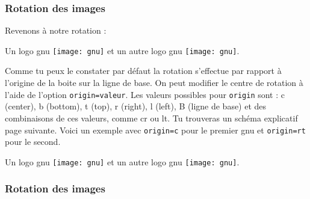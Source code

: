 \documentclass[10pt,hyperref={pdfpagemode=FullScreen},xcolor=dvipsnames,xcolor=table, xcolor=svgnames]{beamer}%
\begin{document}
 \begin{frame}[fragile]
   \frametitle{Rotation des images}
Revenons à notre rotation :
\begin{block}{}
Un logo gnu \texttt{[image: gnu]} et
un autre logo gnu \texttt{[image: gnu]}.
\end{block}
Comme tu peux le constater par défaut la rotation s'effectue par rapport à l'origine de la boite sur la ligne de base. On peut modifier le centre de rotation à l'aide de l'option {\color{blue}\verb!origin=valeur!}. Les valeurs possibles pour  {\color{blue}\verb!origin!} sont : c (center), b (bottom), t (top), r (right), l (left), B (ligne de base) et des combinaisons de ces valeurs, comme cr ou lt. Tu trouveras un schéma explicatif page suivante. Voici un exemple avec {\color{blue}\verb!origin=c!} pour le premier gnu et  {\color{blue}\verb!origin=rt!} pour le second.
\begin{block}{}
Un logo gnu \texttt{[image: gnu]} et
un autre logo gnu \texttt{[image: gnu]}.
\end{block}
\end{frame}
 \begin{frame}[fragile]
   \frametitle{Rotation des images}
\begin{center}
\end{center}

\end{frame}
\end{document}
